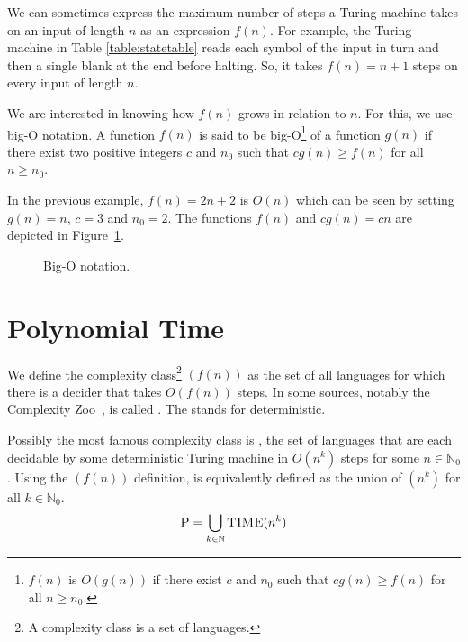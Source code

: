 \documentclass{iansnotes}
\begin{document}
  We can sometimes express the maximum number of steps a Turing machine takes on an input of length $n$ as an expression $f(n)$.
  For example, the Turing machine in Table \ref{table:statetable} reads each symbol of the input in turn and then a single blank at the end before halting.
  So, it takes $f(n) = n + 1$ steps on every input of length $n$.
  
    
  We are interested in knowing how $f(n)$ grows in relation to $n$.
  For this, we use big-O notation.
  A function $f(n)$ is said to be big-O\footnote{$f(n)$ is $O(g(n))$ if there exist $c$ and $n_0$ such that $cg(n) \geq f(n)$ for all $n \geq n_0$.} of a function $g(n)$ if there exist two positive integers $c$ and $n_0$ such that $cg(n) \geq f(n)$ for all \(n \geq n_0 \).

  In the previous example, $f(n) = 2n + 2$ is $O(n)$ which can be seen by setting $g(n) = n$, $c = 3$ and $n_0 = 2$.
  The functions $f(n)$ and $cg(n) = cn$ are depicted in Figure~\ref{figure:bigo}.
  \begin{figure}
  \caption{Big-O notation.}
  \label{figure:bigo}
\end{figure}

\section{Polynomial Time}
  We define the complexity class\footnote{A complexity class is a set of languages.} \((f(n)) \) as the set of all languages for which there is a decider that takes $O\left(f(n)\right)$ steps.
  In some sources, notably the Complexity Zoo~\autocite{complexityZooDTIME},  is called .
  The  stands for deterministic.
  
  Possibly the most famous complexity class is , the set of languages that are each decidable by some deterministic Turing machine in $O(n^k)$ steps for some $n \in \mathbb{N}_0$.
  Using the \((f(n)) \) definition,  is equivalently defined as the union of $(n^k)$ for all $k \in \mathbb{N}_0$.
  $$ \textsc{P} = \bigcup_{k \in \mathbb{N}} \textsc{TIME}(n^k)$$
  
\end{document}
